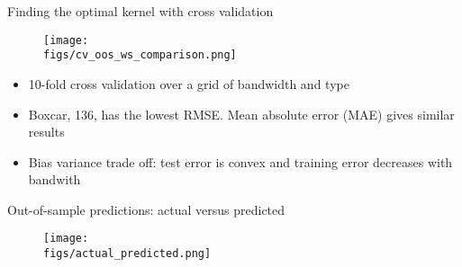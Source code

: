 \documentclass[final, 12pt, aspectratio=169, xcolor={dvipsnames}]{beamer}
\newcommand*{\figs}{../figs}%
\begin{document}
\begin{frame}{Finding the optimal kernel with cross validation}
  \hspace{-0.5cm}
  \begin{minipage}[t]{0.68\linewidth}%
    \vspace{-0.3cm}
    \begin{figure}
      \texttt{[image: \\figs/cv\_oos\_ws\_comparison.png]}
    \end{figure}
  \end{minipage}
  \begin{minipage}[t]{0.28\linewidth}%
    {\footnotesize
      \begin{itemize}
        \item 10-fold cross validation over a grid of bandwidth and type
    \item Boxcar, 136, has the lowest RMSE. Mean absolute error (MAE) gives similar results
      \item Bias variance trade off: test error is convex and training error decreases with bandwith
    \end{itemize}
    }
  \end{minipage}
  
\end{frame}

\begin{frame}{Out-of-sample predictions: actual versus predicted}
  \begin{figure}
    \texttt{[image: \\figs/actual\_predicted.png]}
  \end{figure}
\end{frame}
\end{document}
